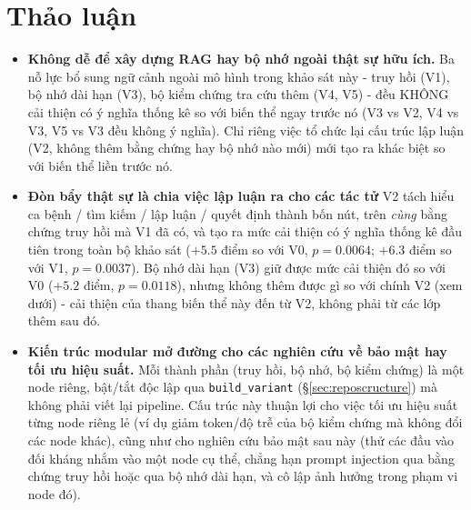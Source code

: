 \documentclass[11pt]{article}
\begin{document}
\section{Thảo luận}
\label{sec:discussion}
\begin{itemize}[nosep]
  \item \textbf{Không dễ để xây dựng RAG hay bộ nhớ ngoài thật sự hữu ích.} Ba nỗ lực bổ sung ngữ
  cảnh ngoài mô hình trong khảo sát này - truy hồi (V1), bộ nhớ dài hạn (V3), bộ kiểm chứng tra cứu thêm
  (V4, V5) - đều KHÔNG cải thiện có ý nghĩa thống kê so với biến thể ngay trước nó (V3 vs V2, V4 vs V3,
  V5 vs V3 đều không ý nghĩa). Chỉ riêng việc tổ chức lại cấu trúc lập luận (V2, không thêm bằng chứng
  hay bộ nhớ nào mới) mới tạo ra khác biệt so với biến thể liền trước nó.
  \item \textbf{Đòn bẩy thật sự là chia việc lập luận ra cho các tác tử} V2 tách hiểu ca
  bệnh / tìm kiếm / lập luận / quyết định thành bốn nút, trên \emph{cùng} bằng chứng truy hồi mà V1 đã
  có, và tạo ra mức cải thiện có ý nghĩa thống kê đầu tiên trong toàn bộ khảo sát ($+5.5$ điểm so với
  V0, $p{=}0.0064$; $+6.3$ điểm so với V1, $p{=}0.0037$). Bộ nhớ dài hạn (V3) giữ được mức cải thiện đó
  so với V0 ($+5.2$ điểm, $p{=}0.0118$), nhưng không thêm được gì so với chính V2 (xem dưới) - cải
  thiện của thang biến thể này đến từ V2, không phải từ các lớp thêm sau đó.
  \item \textbf{Kiến trúc modular mở đường cho các nghiên cứu về bảo mật hay tối ưu hiệu suất.} Mỗi thành phần (truy
  hồi, bộ nhớ, bộ kiểm chứng) là một node riêng, bật/tắt độc lập qua \texttt{build\_variant}
  (\S\ref{sec:reposcructure}) mà không phải viết lại pipeline. Cấu trúc này thuận lợi cho việc tối ưu hiệu
  suất từng node riêng lẻ (ví dụ giảm token/độ trễ của bộ kiểm chứng mà không đổi các node khác), cũng
  như cho nghiên cứu bảo mật sau này (thử các đầu vào đối kháng nhắm vào một node cụ thể, chẳng hạn
  prompt injection qua bằng chứng truy hồi hoặc qua bộ nhớ dài hạn, và cô lập ảnh hưởng trong phạm vi
  node đó).
\end{itemize}

\FloatBarrier
\end{document}
